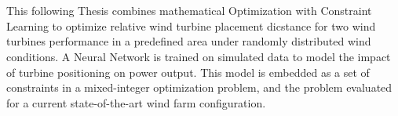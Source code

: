 \chapter{\abstractname}


This following Thesis combines mathematical Optimization with Constraint Learning to optimize relative wind turbine placement dicstance for two wind turbines performance in a predefined area under randomly distributed wind conditions. A Neural Network is trained on simulated data to model the impact of turbine positioning on power output. This model is embedded as a set of constraints in a mixed-integer optimization problem, and the problem evaluated for a current state-of-the-art wind farm configuration.

\makeatletter
{}
{\renewcommand{\abstractname}{Abstract}}
\makeatother